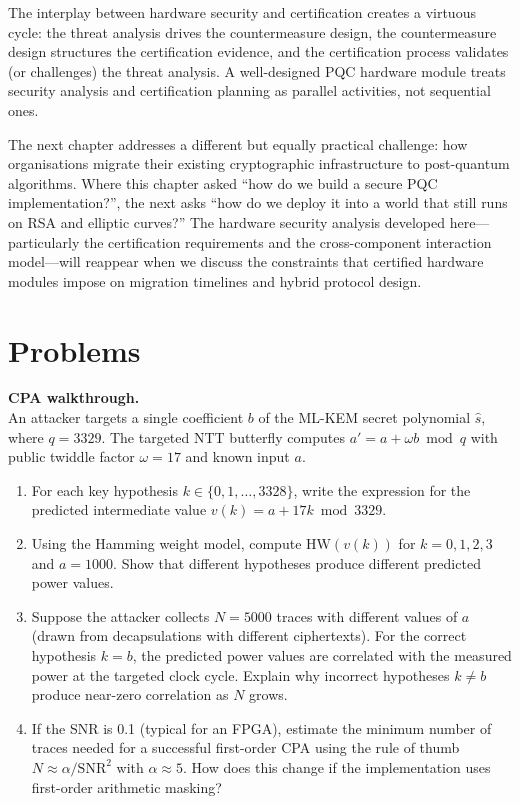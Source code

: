 The interplay between hardware security and certification creates a virtuous cycle: the threat analysis drives the countermeasure design, the countermeasure design structures the certification evidence, and the certification process validates (or challenges) the threat analysis.  A well-designed PQC hardware module treats security analysis and certification planning as parallel activities, not sequential ones.

The next chapter addresses a different but equally practical challenge: how organisations migrate their existing cryptographic infrastructure to post-quantum algorithms.  Where this chapter asked ``how do we build a secure PQC implementation?'', the next asks ``how do we deploy it into a world that still runs on RSA and elliptic curves?''  The hardware security analysis developed here---particularly the certification requirements and the cross-component interaction model---will reappear when we discuss the constraints that certified hardware modules impose on migration timelines and hybrid protocol design.


\section*{Problems}

\begin{prob}
\label{prob:ch13-cpa}
\textbf{CPA walkthrough.}\\
An attacker targets a single coefficient $b$ of the ML-KEM secret polynomial $\hat{s}$, where $q = 3329$.  The targeted NTT butterfly computes $a' = a + \omega b \bmod q$ with public twiddle factor $\omega = 17$ and known input $a$.
\begin{enumerate}
\item[(a)] For each key hypothesis $k \in \{0, 1, \ldots, 3328\}$, write the expression for the predicted intermediate value $v(k) = a + 17k \bmod 3329$.
\item[(b)] Using the Hamming weight model, compute $\text{HW}(v(k))$ for $k = 0, 1, 2, 3$ and $a = 1000$.  Show that different hypotheses produce different predicted power values.
\item[(c)] Suppose the attacker collects $N = 5000$ traces with different values of $a$ (drawn from decapsulations with different ciphertexts).  For the correct hypothesis $k = b$, the predicted power values are correlated with the measured power at the targeted clock cycle.  Explain why incorrect hypotheses $k \neq b$ produce near-zero correlation as $N$ grows.
\item[(d)] If the SNR is 0.1 (typical for an FPGA), estimate the minimum number of traces needed for a successful first-order CPA using the rule of thumb $N \approx \alpha / \text{SNR}^2$ with $\alpha \approx 5$.  How does this change if the implementation uses first-order arithmetic masking?
\end{enumerate}
\end{prob}

